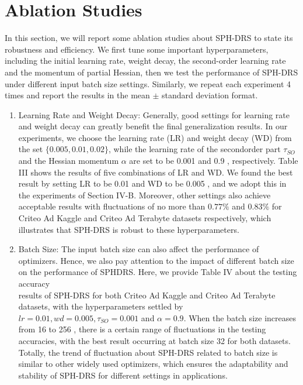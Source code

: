 \documentclass[conference]{IEEEtran}
\begin{document}
\section{Ablation Studies}

In this section, we will report some ablation studies about SPH-DRS to state its robustness and efficiency. We first tune some important hyperparameters, including the initial learning rate, weight decay, the second-order learning rate and the momentum of partial Hessian, then we test the performance of SPH-DRS under different input batch size settings. Similarly, we repeat each experiment 4 times and report the results in the mean $\pm$ standard deviation format.

\begin{enumerate}
  \item Learning Rate and Weight Decay: Generally, good settings for learning rate and weight decay can greatly benefit the final generalization results. In our experiments, we choose the learning rate (LR) and weight decay (WD) from the set $\{0.005,0.01,0.02\}$, while the learning rate of the secondorder part $\tau_{S O}$ and the Hessian momentum $\alpha$ are set to be 0.001 and 0.9 , respectively. Table III shows the results of five combinations of LR and WD. We found the best result by setting LR to be 0.01 and WD to be 0.005 , and we adopt this in the experiments of Section IV-B. Moreover, other settings also achieve acceptable results with fluctuations of no more than $0.77 \%$ and $0.83 \%$ for Criteo Ad Kaggle and Criteo Ad Terabyte datasets respectively, which illustrates that SPH-DRS is robust to these hyperparameters.
  \item Batch Size: The input batch size can also affect the performance of optimizers. Hence, we also pay attention to the impact of different batch size on the performance of SPHDRS. Here, we provide Table IV about the testing accuracy\\
results of SPH-DRS for both Criteo Ad Kaggle and Criteo Ad Terabyte datasets, with the hyperparameters settled by $l r=0.01, w d=0.005, \tau_{S O}=0.001$ and $\alpha=0.9$. When the batch size increases from 16 to 256 , there is a certain range of fluctuations in the testing accuracies, with the best result occurring at batch size 32 for both datasets. Totally, the trend of fluctuation about SPH-DRS related to batch size is similar to other widely used optimizers, which ensures the adaptability and stability of SPH-DRS for different settings in applications.

\end{enumerate}
\end{document}
